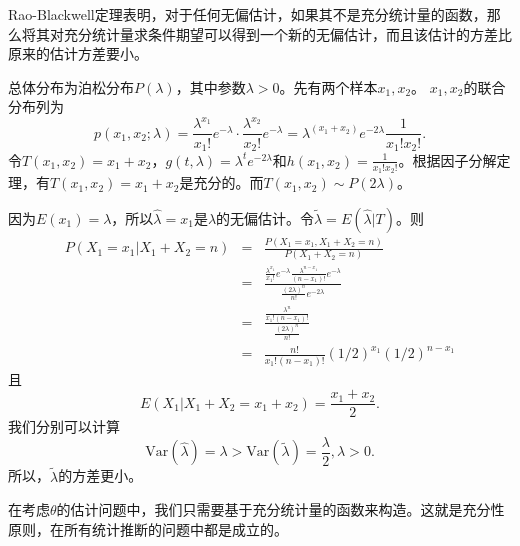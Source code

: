 \begin{remark}
    Rao-Blackwell定理表明，对于任何无偏估计，如果其不是充分统计量的函数，那么将其对充分统计量求条件期望可以得到一个新的无偏估计，而且该估计的方差比原来的估计方差要小。
\end{remark}
\begin{example}
总体分布为泊松分布$P(\lambda)$，其中参数$\lambda >0$。先有两个样本$x_1,x_2$。
$x_1,x_2$的联合分布列为
$$
p(x_1,x_2;\lambda) = \frac{\lambda^{x_1}}{x_1!}e^{-\lambda} \cdot \frac{\lambda^{x_2}}{x_2!}e^{-\lambda} = \lambda^{(x_1+x_2)} e^{-2\lambda}\frac{1}{x_1!x_2!}.
$$
令$T(x_1,x_2)=x_1+x_2$，$g(t,\lambda) = \lambda^{t} e^{-2\lambda}$和$h(x_1,x_2) = \frac{1}{x_1!x_2!}$。根据因子分解定理，有$T(x_1,x_2) = x_1+x_2$是充分的。而$T(x_1,x_2)\sim P(2\lambda)$。

因为$E(x_1) = \lambda$，所以$\hat{\lambda}= x_1$是$\lambda$的无偏估计。令$\tilde{\lambda} = E(\hat{\lambda}|T)$。则
\begin{eqnarray*}
    P(X_1 = x_1|X_1 + X_2 =n) &=& \frac{P(X_1=x_1,X_1+X_2=n)}{P(X_1+X_2=n)}\\
    &=& \frac{\frac{\lambda^{x_1}}{x_1!}e^{-\lambda} \frac{\lambda^{n-x_1}}{(n-x_1)!}e^{-\lambda} }{\frac{(2\lambda)^{n}}{n!}e^{-2\lambda} }\\
    &=& \frac{\frac{\lambda^{n}}{x_1!(n-x_1)!} }{\frac{(2\lambda)^{n}}{n!} }\\
    &=& \frac{n!}{x_1!(n-x_1)!} \left(1/2\right)^{x_1} \left(1/2\right)^{n-x_1} 
\end{eqnarray*}
且$$
E(X_1|X_1+X_2 = x_1+x_2) = \frac{x_1+x_2}{2}. 
$$
我们分别可以计算
$$
\text{Var}(\hat{\lambda}) = \lambda > 
\text{Var}(\tilde{\lambda}) = \frac{\lambda}{2}, \lambda> 0.
$$
所以，$\tilde{\lambda}$的方差更小。
\end{example}
\begin{remark}
    在考虑$\theta$的估计问题中，我们只需要基于充分统计量的函数来构造。这就是充分性原则，在所有统计推断的问题中都是成立的。
\end{remark}

